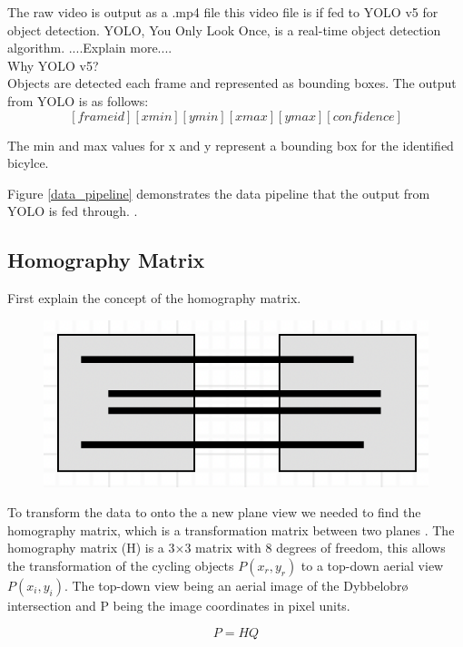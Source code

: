 \documentclass[
10pt, %
a4paper, %
oneside, %
headinclude,footinclude, %
] {book}%
\begin{document}
The raw video is output as a .mp4 file this video file is if fed to YOLO v5 for object detection. YOLO, You Only Look Once,
is a real-time object detection algorithm. ....Explain more.... 
\ \\ 
Why YOLO v5?
\ \\ 
Objects are detected each frame and represented as bounding boxes.
The output from YOLO is as follows: \[ [frame id][xmin][ymin][xmax][ymax][confidence]  \]

The min and max values for x and y represent a bounding box for the identified bicylce.

Figure \ref{data_pipeline} demonstrates the data pipeline that the output from YOLO is fed through. .
\ \\
\subsection{Homography Matrix}

First explain the concept of the homography matrix.
\ \\ 
\begin{figure}[h]
  \includegraphics[scale=1.0]{Homography_proj.png}
  \centering 
  \end{figure}
  \label{homography}

To transform the data to onto the a new plane view we needed to find the homography matrix, which is a transformation matrix between two planes \cite{hartley_zisserman_2004}.
The homography matrix (H) is a 3×3 matrix with 8 degrees of freedom, this allows the transformation of the cycling objects $P(x_r, y_r)$ to a 
top-down aerial view $P(x_i, y_i)$. The top-down view being an aerial image of the Dybbelobrø intersection and P being the image coordinates in pixel units.

\begin{equation}
  P = HQ\label{eq:2}
\end{equation} 
\end{document}
